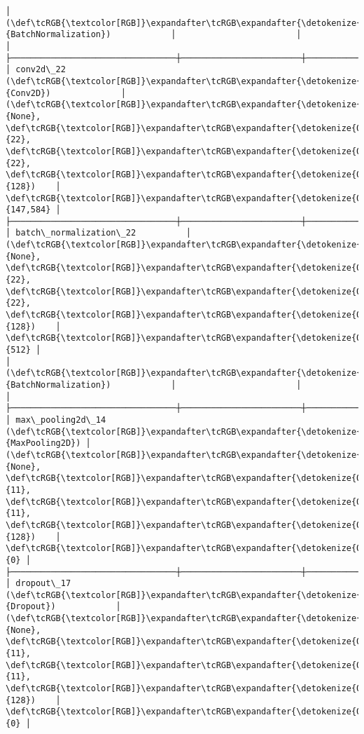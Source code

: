 \documentclass[11pt]{article}
\begin{document}
\begin{Verbatim}[commandchars=\\\{\}]
│ (\def\tcRGB{\textcolor[RGB]}\expandafter\tcRGB\expandafter{\detokenize{0,135,255}}{BatchNormalization})            │                        │               │
├─────────────────────────────────┼────────────────────────┼───────────────┤
│ conv2d\_22 (\def\tcRGB{\textcolor[RGB]}\expandafter\tcRGB\expandafter{\detokenize{0,135,255}}{Conv2D})              │ (\def\tcRGB{\textcolor[RGB]}\expandafter\tcRGB\expandafter{\detokenize{0,215,255}}{None}, \def\tcRGB{\textcolor[RGB]}\expandafter\tcRGB\expandafter{\detokenize{0,175,0}}{22}, \def\tcRGB{\textcolor[RGB]}\expandafter\tcRGB\expandafter{\detokenize{0,175,0}}{22}, \def\tcRGB{\textcolor[RGB]}\expandafter\tcRGB\expandafter{\detokenize{0,175,0}}{128})    │       \def\tcRGB{\textcolor[RGB]}\expandafter\tcRGB\expandafter{\detokenize{0,175,0}}{147,584} │
├─────────────────────────────────┼────────────────────────┼───────────────┤
│ batch\_normalization\_22          │ (\def\tcRGB{\textcolor[RGB]}\expandafter\tcRGB\expandafter{\detokenize{0,215,255}}{None}, \def\tcRGB{\textcolor[RGB]}\expandafter\tcRGB\expandafter{\detokenize{0,175,0}}{22}, \def\tcRGB{\textcolor[RGB]}\expandafter\tcRGB\expandafter{\detokenize{0,175,0}}{22}, \def\tcRGB{\textcolor[RGB]}\expandafter\tcRGB\expandafter{\detokenize{0,175,0}}{128})    │           \def\tcRGB{\textcolor[RGB]}\expandafter\tcRGB\expandafter{\detokenize{0,175,0}}{512} │
│ (\def\tcRGB{\textcolor[RGB]}\expandafter\tcRGB\expandafter{\detokenize{0,135,255}}{BatchNormalization})            │                        │               │
├─────────────────────────────────┼────────────────────────┼───────────────┤
│ max\_pooling2d\_14 (\def\tcRGB{\textcolor[RGB]}\expandafter\tcRGB\expandafter{\detokenize{0,135,255}}{MaxPooling2D}) │ (\def\tcRGB{\textcolor[RGB]}\expandafter\tcRGB\expandafter{\detokenize{0,215,255}}{None}, \def\tcRGB{\textcolor[RGB]}\expandafter\tcRGB\expandafter{\detokenize{0,175,0}}{11}, \def\tcRGB{\textcolor[RGB]}\expandafter\tcRGB\expandafter{\detokenize{0,175,0}}{11}, \def\tcRGB{\textcolor[RGB]}\expandafter\tcRGB\expandafter{\detokenize{0,175,0}}{128})    │             \def\tcRGB{\textcolor[RGB]}\expandafter\tcRGB\expandafter{\detokenize{0,175,0}}{0} │
├─────────────────────────────────┼────────────────────────┼───────────────┤
│ dropout\_17 (\def\tcRGB{\textcolor[RGB]}\expandafter\tcRGB\expandafter{\detokenize{0,135,255}}{Dropout})            │ (\def\tcRGB{\textcolor[RGB]}\expandafter\tcRGB\expandafter{\detokenize{0,215,255}}{None}, \def\tcRGB{\textcolor[RGB]}\expandafter\tcRGB\expandafter{\detokenize{0,175,0}}{11}, \def\tcRGB{\textcolor[RGB]}\expandafter\tcRGB\expandafter{\detokenize{0,175,0}}{11}, \def\tcRGB{\textcolor[RGB]}\expandafter\tcRGB\expandafter{\detokenize{0,175,0}}{128})    │             \def\tcRGB{\textcolor[RGB]}\expandafter\tcRGB\expandafter{\detokenize{0,175,0}}{0} │

\end{Verbatim}
\end{document}
